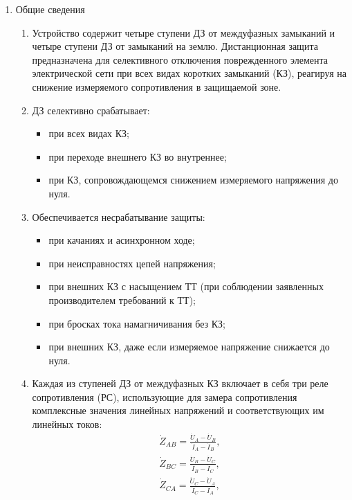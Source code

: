 \color{black}

\begin{enumerate}
\item Общие сведения

\begin{enumerate}

\item
Устройство содержит четыре ступени ДЗ от междуфазных замыканий и четыре ступени ДЗ от замыканий
на землю. Дистанционная защита предназначена для селективного отключения поврежденного элемента
электрической сети при всех видах коротких замыканий (КЗ), реагируя на снижение измеряемого
сопротивления в защищаемой зоне.

\item 
ДЗ селективно срабатывает:
\begin{itemize}
    \item при всех видах КЗ; 
    \item при переходе внешнего КЗ во внутреннее; 
    \item при КЗ, сопровождающемся снижением измеряемого напряжения до нуля.
\end{itemize}

\item 
Обеспечивается несрабатывание защиты:
\begin{itemize} 
	\item при качаниях и асинхронном ходе; 
	\item при неисправностях цепей напряжения;
	\item при внешних КЗ с насыщением ТТ (при соблюдении заявленных производителем требований к ТТ); 
	\item при бросках тока намагничивания без КЗ;
	\item при внешних КЗ, даже если измеряемое напряжение снижается до нуля.
\end{itemize}

\item Каждая из ступеней ДЗ от междуфазных КЗ включает в себя три реле сопротивления (РС), использующие
для замера сопротивления  комплексные значения линейных напряжений и соответствующих им линейных
токов:
\begin{align}
	\dot Z_{AB} =  \frac{\dot U_A - \dot U_B}{\dot I_A - \dot I_B}\label{eq:groupZ1}, \\
	\dot Z_{BC} =  \frac{\dot U_B - \dot U_C}{\dot I_B - \dot I_C}\label{eq:groupZ2}, \\
	\dot Z_{CA} =  \frac{\dot U_C - \dot U_A}{\dot I_C - \dot I_A}\label{eq:groupZ3},
\end{align}


\end{enumerate}
\end{enumerate}
